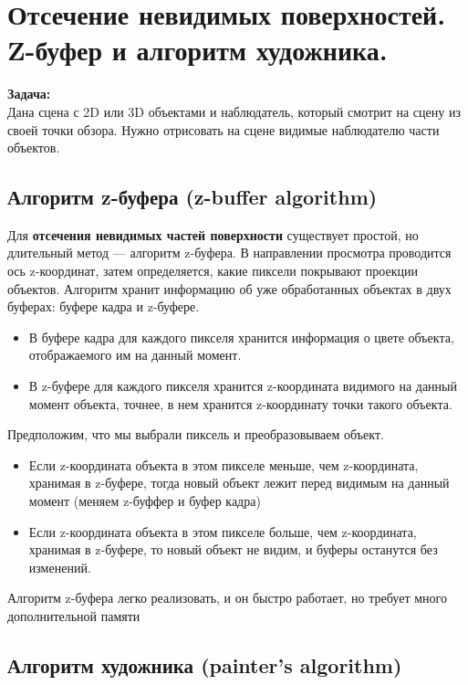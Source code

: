 \section{Отсечение невидимых поверхностей. Z-буфер и алгоритм художника.}


\textbf{Задача:}\\
Дана сцена с 2D или 3D объектами и наблюдатель, который смотрит на сцену из своей точки обзора. 
Нужно отрисовать на сцене видимые наблюдателю части объектов.

\subsection{Алгоритм z-буфера (z-buffer algorithm)}

Для \textbf{отсечения невидимых частей поверхности} существует простой, но длительный метод — алгоритм z-буфера. В направлении просмотра проводится ось z-координат, затем определяется, какие пиксели покрывают проекции объектов. Алгоритм хранит информацию об уже обработанных объектах в двух буферах: буфере кадра и z-буфере.

\begin{itemize}
	\item В буфере кадра для каждого пикселя хранится информация о цвете объекта, отображаемого им на данный момент.
	\item В z-буфере для каждого пикселя хранится z-координата видимого на данный момент объекта, точнее, в нем хранится z-координату точки такого объекта.
\end{itemize}

Предположим, что мы выбрали пиксель и преобразовываем объект.

\begin{itemize}
	\item Если z-координата объекта в этом пикселе меньше, чем z-координата, хранимая в z-буфере, тогда новый объект лежит перед видимым на данный момент (меняем z-буффер и буфер кадра) 
	\item Если z-координата объекта в этом пикселе больше, чем z-координата, хранимая в z-буфере, то новый объект не видим, и буферы останутся без изменений.
\end{itemize}
Алгоритм z-буфера легко реализовать, и он быстро работает, но требует много дополнительной памяти
\newpage
\subsection*{Алгоритм художника (painter's algorithm)}


